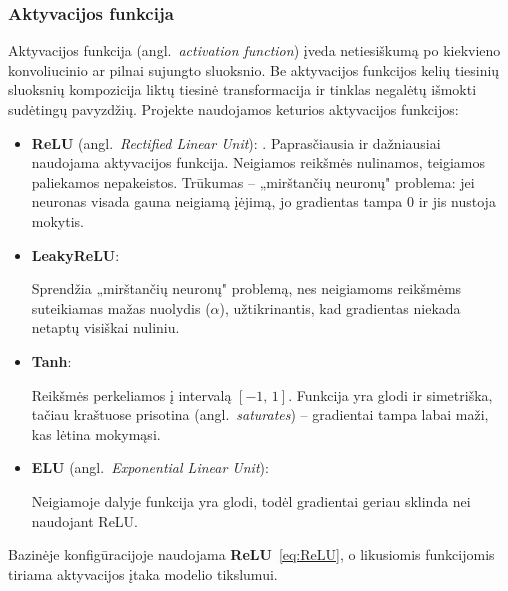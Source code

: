 \subsubsection{Aktyvacijos funkcija}
\label{subsubsec:aktyvacijos_funkcija}

Aktyvacijos funkcija (angl.~\textit{activation function}) įveda netiesiškumą po kiekvieno konvoliucinio ar pilnai sujungto sluoksnio. Be aktyvacijos funkcijos kelių tiesinių sluoksnių kompozicija liktų tiesinė transformacija ir tinklas negalėtų išmokti sudėtingų pavyzdžių. Projekte naudojamos keturios aktyvacijos funkcijos:

\begin{itemize}
    \item \textbf{ReLU} (angl.~\textit{Rectified Linear Unit}):
    .
    Paprasčiausia ir dažniausiai naudojama aktyvacijos funkcija. Neigiamos reikšmės nulinamos, teigiamos paliekamos nepakeistos. Trūkumas – „mirštančių neuronų" problema: jei neuronas visada gauna neigiamą įėjimą, jo gradientas tampa $0$ ir jis nustoja mokytis.
    \item \textbf{LeakyReLU}:
    
    Sprendžia „mirštančių neuronų" problemą, nes neigiamoms reikšmėms suteikiamas mažas nuolydis ($\alpha$), užtikrinantis, kad gradientas niekada netaptų visiškai nuliniu.
    \item \textbf{Tanh}:
    
    Reikšmės perkeliamos į intervalą $[-1,\, 1]$. Funkcija yra glodi ir simetriška, tačiau kraštuose prisotina (angl.~\textit{saturates}) – gradientai tampa labai maži, kas lėtina mokymąsi.
    \item \textbf{ELU} (angl.~\textit{Exponential Linear Unit}):
    
    Neigiamoje dalyje funkcija yra glodi, todėl gradientai geriau sklinda nei naudojant ReLU.
\end{itemize}

Bazinėje konfigūracijoje naudojama \textbf{ReLU}~\eqref{eq:ReLU}, o likusiomis funkcijomis tiriama aktyvacijos įtaka modelio tikslumui.
